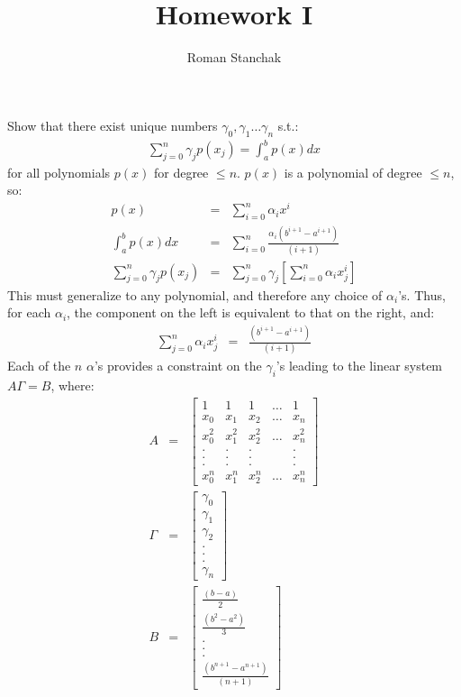 \documentclass{article}
\author{Roman Stanchak}
\title{Homework I}
\newcommand{\ea}[1]{\begin{eqnarray*}#1\end{eqnarray*}}
\begin{document}

\maketitle
{} Show that there exist unique numbers $\gamma_0,\gamma_1\dots\gamma_n$ s.t.:
\ea{
	\sum_{j=0}^n \gamma_j p(x_j) = \int_a^b p(x) dx
}
for all polynomials $p(x)$ for degree $\le n$.
$p(x)$ is a polynomial of degree $\le n$, so:
\ea{
	p(x) &=& \sum_{i=0}^n \alpha_i x^i\\
	\int_a^b p(x) dx &=& \sum_{i=0}^n \frac{\alpha_i(b^{i+1} - a^{i+1})}{(i+1)}\\
	\sum_{j=0}^n \gamma_j p(x_j) &=& \sum_{j=0}^n \gamma_j \left[  \sum_{i=0}^n \alpha_i x_j^i \right]
}
This must generalize to any polynomial, and therefore any choice of $\alpha_i$'s.  Thus, 
for each $\alpha_i$, the component on the left is equivalent to that on the right, and:
\ea{
	\sum_{j=0}^n \alpha_i x_j^i &=& \frac{(b^{i+1} - a^{i+1})}{(i+1)}
}
Each of the $n$ $\alpha$'s provides a constraint on the $\gamma_i$'s leading to the linear system $A\Gamma=B$, where:
\ea{
A &=& \left[
	\begin{array}{ccccc}
		1 & 1 & 1 & \dots & 1 \\
		x_0 & x_1 & x_2 & \dots & x_n \\
		x_0^2 & x_1^2 & x_2^2 & \dots & x_n^2 \\
		. & . & . && .\\
		. & . & . && .\\
		. & . & . && .\\
		x_0^n & x_1^n & x_2^n & \dots & x_n^n
	\end{array}
	\right] \\
\Gamma &=& \left[
\begin{array}{c}
	\gamma_0 \\
	\gamma_1 \\
	\gamma_2 \\
	.\\
	.\\
	.\\
	\gamma_n 
\end{array}
\right] \\
B &=& 
\left[
\begin{array}{c}
	\frac{(b-a)}{2} \\
	\frac{(b^2-a^2)}{3} \\
	.\\
	.\\
	.\\
	\frac{(b^{n+1}-a^{n+1})}{(n+1)} 
\end{array}
\right]
}
\end{document}
